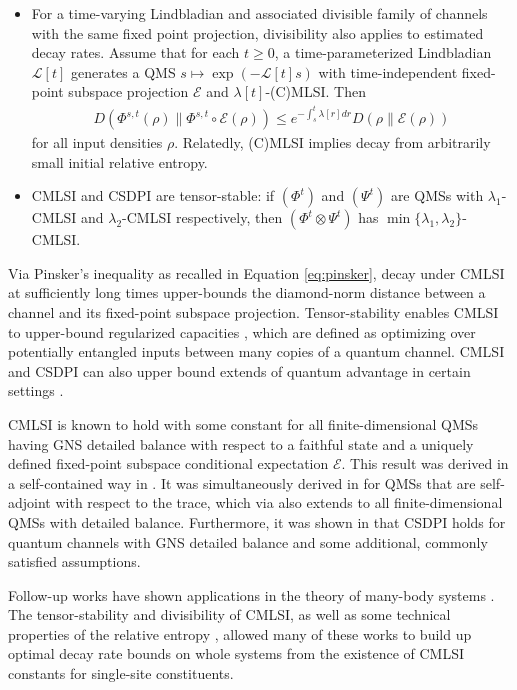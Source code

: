 \documentclass[accepted=2026-02-01, letterpaper]{quantumarticle}
\newcommand{\E}{\mathcal{E}}
\renewcommand{\L}{\mathcal{L}}
\begin{document}
\begin{itemize}
    \item For a time-varying Lindbladian and associated divisible family of channels with the same fixed point projection, divisibility also applies to estimated decay rates. Assume that for each $t \geq 0$, a time-parameterized Lindbladian $\L[t]$ generates a QMS $s \mapsto \exp(-\L[t] s)$ with time-independent fixed-point subspace projection $\E$ and $\lambda[t]$-(C)MLSI. Then
    \begin{equation} \label{eq:divisdecay}
    \begin{split}
        D(\Phi^{s,t}(\rho) \| \Phi^{s,t} \circ \E(\rho))
        \leq e^{ - \int_s^t \lambda[r] d r } D(\rho \| \E(\rho))
    \end{split}
    \end{equation}
    for all input densities $\rho$. Relatedly, (C)MLSI implies decay from arbitrarily small initial relative entropy.
    \item CMLSI and CSDPI are tensor-stable: if $(\Phi^t)$ and $(\Psi^t)$ are QMSs with $\lambda_1$-CMLSI and $\lambda_2$-CMLSI respectively, then $(\Phi^t \otimes \Psi^t)$ has $\min\{\lambda_1, \lambda_2\}$-CMLSI.
\end{itemize}
Via Pinsker's inequality as recalled in Equation \eqref{eq:pinsker}, decay under CMLSI at sufficiently long times upper-bounds the diamond-norm distance between a channel and its fixed-point subspace projection. Tensor-stability enables CMLSI to upper-bound regularized capacities \cite{bardet_group_2021}, which are defined as optimizing over potentially entangled inputs between many copies of a quantum channel. CMLSI and CSDPI can also upper bound extends of quantum advantage in certain settings \cite{stilck_franca_limitations_2021}.

CMLSI is known to hold with some constant for all finite-dimensional QMSs having GNS detailed balance with respect to a faithful state and a uniquely defined fixed-point subspace conditional expectation $\E$. This result was derived in a self-contained way in \cite{gao_complete_2025}. It was simultaneously derived in \cite{gao_geometric_2021} for QMSs that are self-adjoint with respect to the trace, which via \cite{junge_stability_2022} also extends to all finite-dimensional QMSs with detailed balance. Furthermore, it was shown in \cite{gao_complete_2025} that CSDPI holds for quantum channels with GNS detailed balance and some additional, commonly satisfied assumptions.

Follow-up works have shown applications in the theory of many-body systems \cite{bardet_entropy_2024,bardet_rapid_2023, chen_fast_2023}. The tensor-stability and divisibility of CMLSI, as well as some technical properties of the relative entropy \cite{laracuente_quasi-factorization_2022}, allowed many of these works to build up optimal decay rate bounds on whole systems from the existence of CMLSI constants for single-site constituents.
\end{document}
